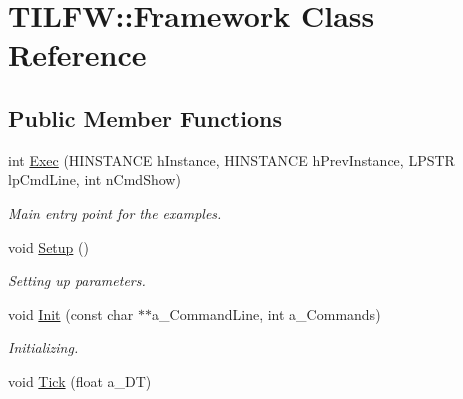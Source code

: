 \hypertarget{class_t_i_l_f_w_1_1_framework}{
\section{TILFW::Framework Class Reference}
\label{class_t_i_l_f_w_1_1_framework}
}
\subsection*{Public Member Functions}
\begin{DoxyCompactItemize}
\item 
\hypertarget{class_t_i_l_f_w_1_1_framework_ae741a615824b09b039531c1ecd0c4ebe}{
int \hyperlink{class_t_i_l_f_w_1_1_framework_ae741a615824b09b039531c1ecd0c4ebe}{Exec} (HINSTANCE hInstance, HINSTANCE hPrevInstance, LPSTR lpCmdLine, int nCmdShow)}
\label{class_t_i_l_f_w_1_1_framework_ae741a615824b09b039531c1ecd0c4ebe}

\begin{DoxyCompactList}\small\item\em Main entry point for the examples. \item\end{DoxyCompactList}\item 
\hypertarget{class_t_i_l_f_w_1_1_framework_a2416aef2383b7d879a9c249b1a303641}{
void \hyperlink{class_t_i_l_f_w_1_1_framework_a2416aef2383b7d879a9c249b1a303641}{Setup} ()}
\label{class_t_i_l_f_w_1_1_framework_a2416aef2383b7d879a9c249b1a303641}

\begin{DoxyCompactList}\small\item\em Setting up parameters. \item\end{DoxyCompactList}\item 
\hypertarget{class_t_i_l_f_w_1_1_framework_a35b3f67924bad5512ed4e279f1ad91aa}{
void \hyperlink{class_t_i_l_f_w_1_1_framework_a35b3f67924bad5512ed4e279f1ad91aa}{Init} (const char $\ast$$\ast$a\_\-CommandLine, int a\_\-Commands)}
\label{class_t_i_l_f_w_1_1_framework_a35b3f67924bad5512ed4e279f1ad91aa}

\begin{DoxyCompactList}\small\item\em Initializing. \item\end{DoxyCompactList}\item 
\hypertarget{class_t_i_l_f_w_1_1_framework_a42420a83c470902e957af36baddd53ee}{
void \hyperlink{class_t_i_l_f_w_1_1_framework_a42420a83c470902e957af36baddd53ee}{Tick} (float a\_\-DT)}
\label{class_t_i_l_f_w_1_1_framework_a42420a83c470902e957af36baddd53ee}


\end{DoxyCompactItemize}
